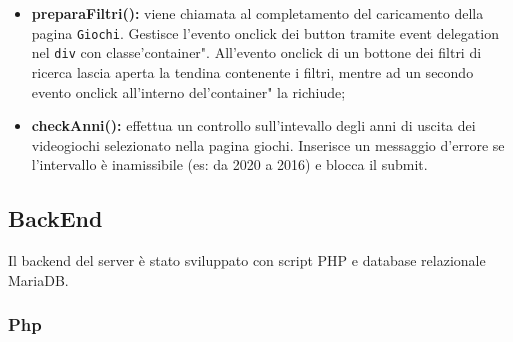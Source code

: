 \begin{itemize}
	\item \textbf{preparaFiltri(): } viene chiamata al completamento del caricamento della pagina \texttt{Giochi}. Gestisce l'evento onclick dei button tramite event delegation nel \texttt{div} con classe'container". All'evento onclick di un bottone dei filtri di ricerca lascia aperta la tendina contenente i filtri, mentre ad un secondo evento onclick all'interno del'container" la richiude; \\

	\item \textbf{checkAnni(): } effettua un controllo sull'intevallo degli anni di uscita dei videogiochi selezionato nella pagina giochi.
	Inserisce un messaggio d'errore se l'intervallo è inamissibile (es: da 2020 a 2016) e blocca il submit. \\
\end{itemize}




\subsection{BackEnd}
Il backend del server è stato sviluppato con script PHP e database relazionale MariaDB.

\subsubsection{Php}

